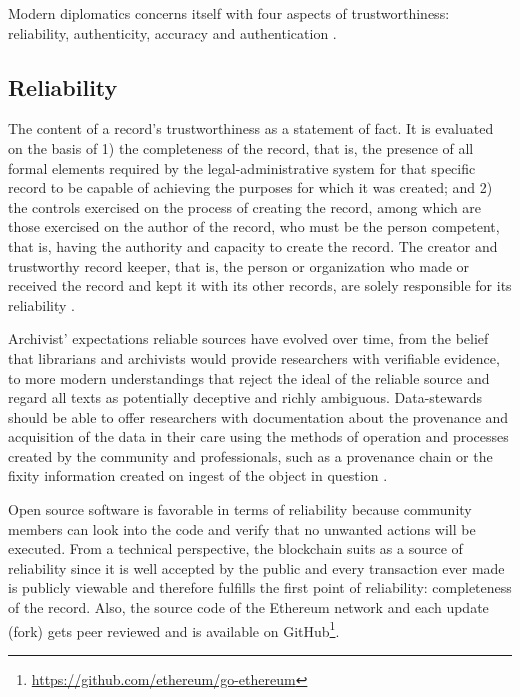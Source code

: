 Modern diplomatics concerns itself with four aspects of trustworthiness: reliability, authenticity, accuracy and authentication \cite[10]{kirschenbaum2010digital}.

\subsection{Reliability}
The content of a record's trustworthiness as a statement of fact. It is evaluated on the basis of 1) the completeness of the record, that is, the presence of all formal elements required by the legal-administrative system for that specific record to be capable of achieving the purposes for which it was created; and 2) the controls exercised on the process of creating the record, among which are those exercised on the author of the record, who must be the person competent, that is, having the authority and capacity to create the record.
The creator and trustworthy record keeper, that is, the person or organization who made or received the record and kept it with its other records, are solely responsible for its reliability \cite[52]{duranti2009digital}.

Archivist' expectations reliable sources have evolved over time, from the belief that librarians and archivists would provide researchers with verifiable evidence, to more modern understandings that reject the ideal of the reliable source and regard all texts as potentially deceptive and richly ambiguous. Data-stewards should be able to offer researchers with documentation about the provenance and acquisition of the data in their care using the methods of operation and processes created by the community and professionals, such as a provenance chain or the fixity information created on ingest of the object in question \cite[32]{kirschenbaum2010digital}.

Open source software is favorable in terms of reliability because community members can look into the code and verify that no unwanted actions will be executed. From a technical perspective, the blockchain suits as a source of reliability since it is well accepted by the public and every transaction ever made is publicly viewable and therefore fulfills the first point of reliability: completeness of the record. Also, the source code of the Ethereum network and each update (fork) gets peer reviewed and is available on GitHub\footnote{\url{https://github.com/ethereum/go-ethereum}}.


